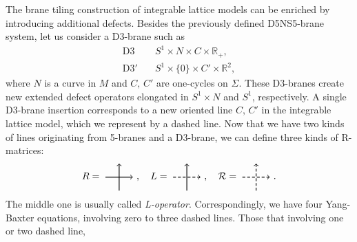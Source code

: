 The brane tiling construction of integrable lattice models can be
enriched by introducing additional defects. Besides the previously
defined D5NS5-brane system, let us consider a D3-brane such as
\begin{align}
  \mathrm{D3}    &  \quad S^{1}  \times  N  \times  C  \times  \mathbb{R}_{+}, \label{eq:D3}\\
  \mathrm{D3'}   &  \quad S^{1}  \times \{ 0\}  \times  C'  \times  \mathbb{R}^{2}, \label{eq:D3'}
\end{align}
where $N$ is a curve in $M$ and $C,\,C'$ are one-cycles on $\Sigma$.
These D3-branes create new extended defect operators elongated in $S^1\times N$ and $S^1$, respectively.
A single D3-brane insertion corresponds to a new oriented line $C,\,C'$ in
the integrable lattice model, which we represent by a dashed line.
Now that we have two kinds of lines originating from 5-branes and a D3-brane,
we can define three kinds of R-matrices:
\begin{equation}
  R=
    \begin{tikzpicture}[scale=0.5, baseline=(x.base)]
        \node (x) at (0,0) {\vphantom{x}};

        \draw[thick, ->] (0,0) -- (2,0);
        \draw[thick, ->] (1,-1) -- (1,1);

    \end{tikzpicture}
  ~ ,
  \quad
  L=
    \begin{tikzpicture}[scale=0.5, baseline=(x.base)]
        \node (x) at (0,0) {\vphantom{x}};

        \draw[thick, densely dashed, ->] (0,0) -- (2,0);
        \draw[thick, ->] (1,-1) -- (1,1);

    \end{tikzpicture}
  ~ ,
  \quad
  \mathcal{R}=
    \begin{tikzpicture}[scale=0.5, baseline=(x.base)]
        \node (x) at (0,0) {\vphantom{x}};

        \draw[thick, densely dashed, ->] (0,0) -- (2,0);
        \draw[thick, densely dashed, ->] (1,-1) -- (1,1);

    \end{tikzpicture}
  ~ .
\end{equation}
The middle one is usually called \emph{L-operator}. Correspondingly,
we have four Yang-Baxter equations, involving zero to three dashed
lines. Those that involving one or two dashed line,
